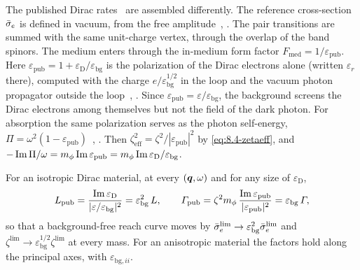 The published Dirac rates~\cite{hochberg2018detection,geilhufe2020dirac} are assembled differently. The reference cross-section $\bar{\sigma}_{e}$ is defined in vacuum, from the free amplitude~\cite[Eqs.~(3.8), (3.10), (3.11)]{hochberg2018detection}, \cite[Eqs.~(2.3), (2.4)]{geilhufe2020dirac}. The pair transitions are summed with the same unit-charge vertex, through the overlap of the band spinors. The medium enters through the in-medium form factor $F_{\mathrm{med}} = 1/\varepsilon_{\mathrm{pub}}$. Here $\varepsilon_{\mathrm{pub}} = 1 + \varepsilon_{\mathrm{D}}/\varepsilon_{\mathrm{bg}}$ is the polarization of the Dirac electrons alone (written $\varepsilon_r$ there), computed with the charge $e/\varepsilon_{\mathrm{bg}}^{1/2}$ in the loop and the vacuum photon propagator outside the loop~\cite[Eqs.~(2.5), (2.6), (3.7), (3.11), (A.8)]{hochberg2018detection}, \cite[Eqs.~(2.5)--(2.7), (3.3)]{geilhufe2020dirac}. Since $\varepsilon_{\mathrm{pub}} = \varepsilon/\varepsilon_{\mathrm{bg}}$, the background screens the Dirac electrons among themselves but not the field of the dark photon. For absorption the same polarization serves as the photon self-energy, $\Pi = \omega^2(1 - \varepsilon_{\mathrm{pub}})$~\cite[Eqs.~(4.4), (4.5)]{hochberg2018detection}, \cite[Eqs.~(2.25)--(2.27)]{geilhufe2020dirac}. Then $\zeta_{\mathrm{eff}}^2 = \zeta^2/|\varepsilon_{\mathrm{pub}}|^2$ by \cref{eq:8.4-zetaeff}, and $-\operatorname{Im}\Pi/\omega = m_\phi\operatorname{Im}\varepsilon_{\mathrm{pub}} = m_\phi\operatorname{Im}\varepsilon_{\mathrm{D}}/\varepsilon_{\mathrm{bg}}$.
\begin{keyresult}
For an isotropic Dirac material, at every $(\bm{q},\omega)$ and for any size of $\varepsilon_{\mathrm{D}}$,
\begin{equation}
  L_{\mathrm{pub}} = \frac{\operatorname{Im}\varepsilon_{\mathrm{D}}}{|\varepsilon/\varepsilon_{\mathrm{bg}}|^2} = \varepsilon_{\mathrm{bg}}^2\,L , \qquad
  \varGamma_{\mathrm{pub}} = \zeta^2m_\phi\,\frac{\operatorname{Im}\varepsilon_{\mathrm{pub}}}{|\varepsilon_{\mathrm{pub}}|^2} = \varepsilon_{\mathrm{bg}}\,\varGamma ,
  \label{eq:16.1-ratio}
\end{equation}
so that a background-free reach curve moves by $\bar{\sigma}_{e}^{\mathrm{lim}} \to \varepsilon_{\mathrm{bg}}^2\bar{\sigma}_{e}^{\mathrm{lim}}$ and $\zeta^{\mathrm{lim}} \to \varepsilon_{\mathrm{bg}}^{1/2}\zeta^{\mathrm{lim}}$ at every mass. For an anisotropic material the factors hold along the principal axes, with $\varepsilon_{\mathrm{bg},ii}$.
\end{keyresult}
